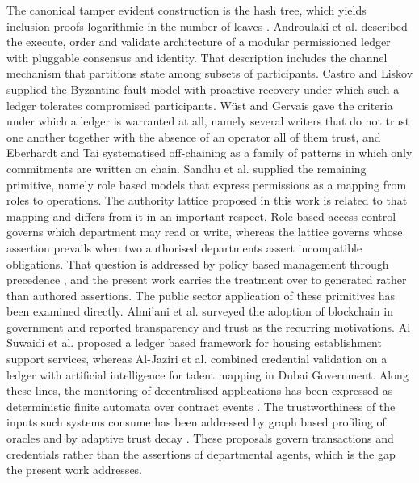 \documentclass[journal]{IEEEtran}
\begin{document}
The canonical tamper evident construction is the hash tree, which yields inclusion proofs logarithmic in the number of leaves \cite{merkle1988signature}. Androulaki et al. \cite{androulaki2018fabric} described the execute, order and validate architecture of a modular permissioned ledger with pluggable consensus and identity. That description includes the channel mechanism that partitions state among subsets of participants. Castro and Liskov \cite{castro2002pbft} supplied the Byzantine fault model with proactive recovery under which such a ledger tolerates compromised participants. W\"{u}st and Gervais \cite{wust2018blockchain} gave the criteria under which a ledger is warranted at all, namely several writers that do not trust one another together with the absence of an operator all of them trust, and Eberhardt and Tai \cite{eberhardt2017offchain} systematised off-chaining as a family of patterns in which only commitments are written on chain. Sandhu et al. \cite{sandhu1996rbac} supplied the remaining primitive, namely role based models that express permissions as a mapping from roles to operations. The authority lattice proposed in this work is related to that mapping and differs from it in an important respect. Role based access control governs which department may read or write, whereas the lattice governs whose assertion prevails when two authorised departments assert incompatible obligations. That question is addressed by policy based management through precedence \cite{lupu1999conflicts}, and the present work carries the treatment over to generated rather than authored assertions. The public sector application of these primitives has been examined directly. Almi'ani et al. \cite{almiani2026government} surveyed the adoption of blockchain in government and reported transparency and trust as the recurring motivations. Al Suwaidi et al. \cite{almiani2024housing} proposed a ledger based framework for housing establishment support services, whereas Al-Jaziri et al. \cite{almiani2026skillchain} combined credential validation on a ledger with artificial intelligence for talent mapping in Dubai Government. Along these lines, the monitoring of decentralised applications has been expressed as deterministic finite automata over contract events \cite{almiani2024qos}. The trustworthiness of the inputs such systems consume has been addressed by graph based profiling of oracles \cite{almiani2023oracles} and by adaptive trust decay \cite{almiani2026trustdecay}. These proposals govern transactions and credentials rather than the assertions of departmental agents, which is the gap the present work addresses.
\end{document}

